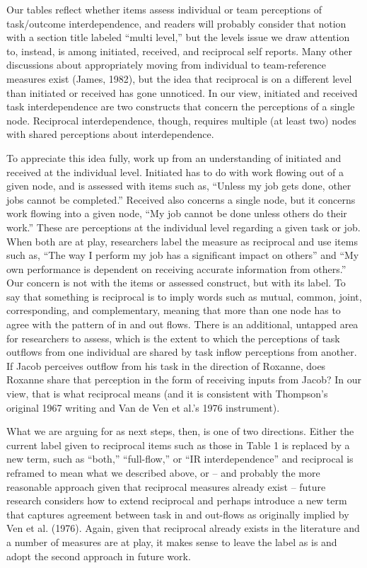 \documentclass[english,,man]{apa6}
\theoremstyle{definition}
\theoremstyle{definition}
\theoremstyle{definition}
\theoremstyle{remark}
\begin{document}
Our tables reflect whether items assess individual or team perceptions
of task/outcome interdependence, and readers will probably consider that
notion with a section title labeled \enquote{multi level,} but the
levels issue we draw attention to, instead, is among initiated,
received, and reciprocal self reports. Many other discussions about
appropriately moving from individual to team-reference measures exist
(James, 1982), but the idea that reciprocal is on a different level than
initiated or received has gone unnoticed. In our view, initiated and
received task interdependence are two constructs that concern the
perceptions of a single node. Reciprocal interdependence, though,
requires multiple (at least two) nodes with shared perceptions about
interdependence.

To appreciate this idea fully, work up from an understanding of
initiated and received at the individual level. Initiated has to do with
work flowing out of a given node, and is assessed with items such as,
\enquote{Unless my job gets done, other jobs cannot be completed.}
Received also concerns a single node, but it concerns work flowing into
a given node, \enquote{My job cannot be done unless others do their
work.} These are perceptions at the individual level regarding a given
task or job. When both are at play, researchers label the measure as
reciprocal and use items such as, \enquote{The way I perform my job has
a significant impact on others} and \enquote{My own performance is
dependent on receiving accurate information from others.} Our concern is
not with the items or assessed construct, but with its label. To say
that something is reciprocal is to imply words such as mutual, common,
joint, corresponding, and complementary, meaning that more than one node
has to agree with the pattern of in and out flows. There is an
additional, untapped area for researchers to assess, which is the extent
to which the perceptions of task outflows from one individual are shared
by task inflow perceptions from another. If Jacob perceives outflow from
his task in the direction of Roxanne, does Roxanne share that perception
in the form of receiving inputs from Jacob? In our view, that is what
reciprocal means (and it is consistent with Thompson's original 1967
writing and Van de Ven et al.'s 1976 instrument).

What we are arguing for as next steps, then, is one of two directions.
Either the current label given to reciprocal items such as those in
Table 1 is replaced by a new term, such as \enquote{both,}
\enquote{full-flow,} or \enquote{IR interdependence} and reciprocal is
reframed to mean what we described above, or -- and probably the more
reasonable approach given that reciprocal measures already exist --
future research considers how to extend reciprocal and perhaps introduce
a new term that captures agreement between task in and out-flows as
originally implied by Ven et al. (1976). Again, given that reciprocal
already exists in the literature and a number of measures are at play,
it makes sense to leave the label as is and adopt the second approach in
future work.
\end{document}
